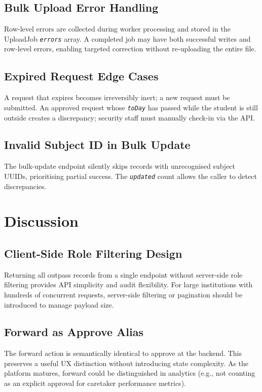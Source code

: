 \documentclass[12pt,a4paper]{report}
\newcommand{\field}[1]{\texttt{\textit{#1}}}
\begin{document}
\section{Bulk Upload Error Handling}

Row-level errors are collected during worker processing and stored in the UploadJob \field{errors} array. A completed job may have both successful writes and row-level errors, enabling targeted correction without re-uploading the entire file.

\section{Expired Request Edge Cases}

A request that expires becomes irreversibly inert; a new request must be submitted. An approved request whose \field{toDay} has passed while the student is still outside creates a discrepancy; security staff must manually check-in via the API.

\section{Invalid Subject ID in Bulk Update}

The bulk-update endpoint silently skips records with unrecognised subject UUIDs, prioritising partial success. The \field{updated} count allows the caller to detect discrepancies.

\chapter{Discussion}

\section{Client-Side Role Filtering Design}

Returning all outpass records from a single endpoint without server-side role filtering provides API simplicity and audit flexibility. For large institutions with hundreds of concurrent requests, server-side filtering or pagination should be introduced to manage payload size.

\section{Forward as Approve Alias}

The forward action is semantically identical to approve at the backend. This preserves a useful UX distinction without introducing state complexity. As the platform matures, forward could be distinguished in analytics (e.g., not counting as an explicit approval for caretaker performance metrics).
\end{document}
